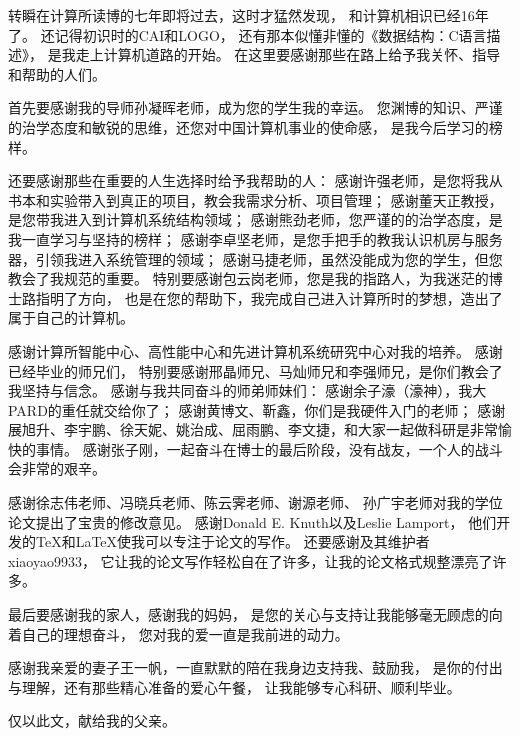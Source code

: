
\begin{ack}

转瞬在计算所读博的七年即将过去，这时才猛然发现，
和计算机相识已经16年了。
还记得初识时的CAI和LOGO，
还有那本似懂非懂的《数据结构：C语言描述》，
是我走上计算机道路的开始。
在这里要感谢那些在路上给予我关怀、指导和帮助的人们。

首先要感谢我的导师孙凝晖老师，成为您的学生我的幸运。
您渊博的知识、严谨的治学态度和敏锐的思维，还您对中国计算机事业的使命感，
是我今后学习的榜样。

还要感谢那些在重要的人生选择时给予我帮助的人：
感谢许强老师，是您将我从书本和实验带入到真正的项目，教会我需求分析、项目管理；
感谢董天正教授，是您带我进入到计算机系统结构领域；
感谢熊劲老师，您严谨的的治学态度，是我一直学习与坚持的榜样；
感谢李卓坚老师，是您手把手的教我认识机房与服务器，引领我进入系统管理的领域；
感谢马捷老师，虽然没能成为您的学生，但您教会了我规范的重要。
特别要感谢包云岗老师，您是我的指路人，为我迷茫的博士路指明了方向，
也是在您的帮助下，我完成自己进入计算所时的梦想，造出了属于自己的计算机。

感谢计算所智能中心、高性能中心和先进计算机系统研究中心对我的培养。
感谢已经毕业的师兄们，
特别要感谢邢晶师兄、马灿师兄和李强师兄，是你们教会了我坚持与信念。
感谢与我共同奋斗的师弟师妹们：
感谢余子濠（濠神），我大PARD的重任就交给你了；
感谢黄博文、靳鑫，你们是我硬件入门的老师；
感谢展旭升、李宇鹏、徐天妮、姚治成、屈雨鹏、李文捷，和大家一起做科研是非常愉快的事情。
感谢张子刚，一起奋斗在博士的最后阶段，没有战友，一个人的战斗会非常的艰辛。

感谢徐志伟老师、冯晓兵老师、陈云霁老师、谢源老师、
孙广宇老师对我的学位论文提出了宝贵的修改意见。
感谢Donald E. Knuth以及Leslie Lamport，
他们开发的\TeX 和\LaTeX 使我可以专注于论文的写作。
还要感谢\ucasthesis 及其维护者xiaoyao9933，
它让我的论文写作轻松自在了许多，让我的论文格式规整漂亮了许多。

最后要感谢我的家人，感谢我的妈妈，
是您的关心与支持让我能够毫无顾虑的向着自己的理想奋斗，
您对我的爱一直是我前进的动力。

感谢我亲爱的妻子王一帆，一直默默的陪在我身边支持我、鼓励我，
是你的付出与理解，还有那些精心准备的爱心午餐，
让我能够专心科研、顺利毕业。

仅以此文，献给我的父亲。
\newline\newline


\end{ack}
